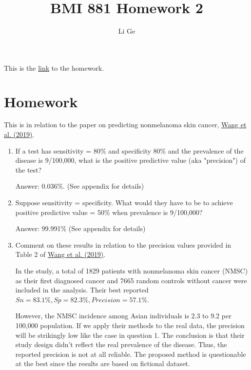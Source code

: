 \documentclass[11pt,letterpaper]{article}
\title{BMI 881 Homework 2}
\author{Li Ge}
\begin{document}
	\maketitle
	This is the \href{https://kbroman.org/BMI881/homework2.html}{link} to the homework.
	
\section*{Homework}
This is in relation to the paper on predicting nonmelanoma skin cancer, \href{https://doi.org/10.1001/jamadermatol.2019.2335}{Wang et al. (2019)}. 

\begin{enumerate}
 	\item If a test has sensitivity = 80\% and specificity 80\% and the prevalence of the disease is 9/100,000, what is the positive predictive value (aka "precision") of the test?

	Answer: 0.036\%. (See appendix for details)

	\item Suppose sensitivity = specificity. What would they have to be to achieve positive predictive value = 50\% when prevalence is 9/100,000?

	Answer: 99.991\% (See appendix for details)

	\item Comment on these results in relation to the precision values provided in Table 2 of \href{https://doi.org/10.1001/jamadermatol.2019.2335}{Wang et al. (2019)}.

	In the study, a total of 1829 patients with nonmelanoma skin cancer (NMSC) as their first diagnosed cancer and 7665 random controls without cancer were included in the analysis. Their best reported $Sn = 83.1\%, Sp = 82.3\%, Precision = 57.1\%$.
	
	However, the NMSC incidence among Asian individuals is 2.3 to 9.2 per 100,000 population. If we apply their methods to the real data, the precision will be strikingly low like the case in question 1. The conclusion is that their study design didn't reflect the real prevalence of the disease. Thus, the reported precision is not at all reliable. The proposed method is questionable at the best since the results are based on fictional dataset.
 	
\end{enumerate}
	
\end{document}
